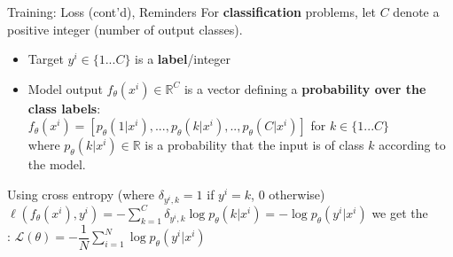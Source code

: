 \begin{frame}{Training: Loss (cont'd), Reminders}
\vspace{-5mm}
For \textbf{classification} problems, let $C$ denote a positive integer (number of output classes).
\begin{itemize}
\item Target $y^i  \in \{1...C\}$ is a  \textbf{label}/integer
\item Model output $f_{\theta}(x^i) \in \mathbb{R}^C$ is a vector defining a \textbf{probability over the class labels}:\\
$f_{\theta}(x^i)= \left[p_{\theta}(1|x^i),... , p_{\theta}(k|x^i),.. ,p_{\theta}(C|x^i)\right]$ for $k\in \{1...C\}$\\
where $p_{\theta}(k|x^i) \in \mathbb{R}$ is a probability that the input is of class $k$ according to the model.\\
\end{itemize}
\vsp
Using cross entropy (where $\delta_{y^i, k} = 1$ if $y^i=k$, $0$ otherwise) $\displaystyle \ell\left(f_{\theta}(x^i), y^i\right) = - \sum_{k=1}^C \delta_{y^i, k} \log p_{\theta}(k|x^i) = - \log p_{\theta}(y^i|x^i)$ \hspace{1mm} we get the\\
: $\displaystyle \mathcal{L(\theta)} = -\dfrac{1}{N} \sum_{i=1}^N \log p_{\theta}(y^i|x^i)$
\end{frame}

